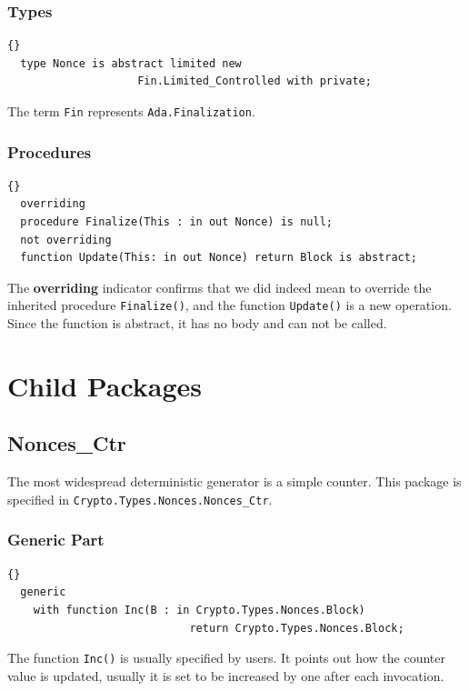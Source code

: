 \subsubsection*{Types}
\begin{lstlisting}{}
  type Nonce is abstract limited new
  					Fin.Limited_Controlled with private;
\end{lstlisting}
The term \texttt{Fin} represents \texttt{Ada.Finalization}.
\subsubsection*{Procedures}
\begin{lstlisting}{}
  overriding
  procedure Finalize(This : in out Nonce) is null;
  not overriding
  function Update(This: in out Nonce) return Block is abstract;
\end{lstlisting}
The \textbf{overriding} indicator confirms that we did indeed mean to
override the inherited procedure \texttt{Finalize()}, and the function
\texttt{Update()} is a new operation. Since the function is abstract,
it has no body and can not be called.\\


\section{Child Packages}
\subsection*{Nonces\_Ctr}
The most widespread deterministic generator is a simple counter. This
package is specified in \texttt{Crypto.Types.Nonces.Nonces\_Ctr}.


\subsubsection*{Generic Part}
\begin{lstlisting}{}
  generic
    with function Inc(B : in Crypto.Types.Nonces.Block)
   							return Crypto.Types.Nonces.Block;
\end{lstlisting}
The function \texttt{Inc()} is usually specified by users. It points
out how the counter value is updated, usually it is set to be
increased by one after each invocation.


